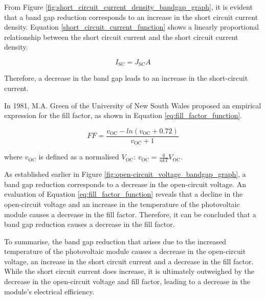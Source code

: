 \noindent From Figure \ref{fig:short_circuit_current_density_bandgap_graph}, it is evident that a band gap reduction corresponds to an increase in the short circuit current density. Equation \ref{short_circuit_current_function} shows a linearly proportional relationship between the short circuit current and the short circuit current density.

\begin{equation}
    I_\text{SC} = J_\text{SC}A
    \label{short_circuit_current_function}
\end{equation}

\noindent Therefore, a decrease in the band gap leads to an increase in the short-circuit current. \cite{HonsbergShort-CircuitCurrent}\vspace{0.5em}

\noindent In 1981, M.A. Green of the University of New South Wales proposed an empirical expression for the fill factor, as shown in Equation \ref{eq:fill_factor_function}.

\begin{equation}
    FF = \frac{v_\text{OC} - ln(v_\text{OC} + 0.72)}{v_\text{OC} + 1}
    \label{eq:fill_factor_function}
\end{equation}\vspace{0em}

\noindent where $v_\text{OC}$ is defined as a normalised $V_\text{OC}$: $v_\text{OC} = \frac{q}{nkT} V_\text{OC}$. \cite{Green1981SolarExpressions}\vspace{0.5em}

\noindent As established earlier in Figure \ref{fig:open-circuit_voltage_bandgap_graph}, a band gap reduction corresponds to a decrease in the open-circuit voltage. An evaluation of Equation \ref{eq:fill_factor_function} reveals that a decline in the open-circuit voltage and an increase in the temperature of the photovoltaic module causes a decrease in the fill factor. Therefore, it can be concluded that a band gap reduction causes a decrease in the fill factor.\vspace{0.5em}

\noindent To summarise, the band gap reduction that arises due to the increased temperature of the photovoltaic module causes a decrease in the open-circuit voltage, an increase in the short circuit current and a decrease in the fill factor. While the short circuit current does increase, it is ultimately outweighed by the decrease in the open-circuit voltage and fill factor, leading to a decrease in the module's electrical efficiency.\vspace{0.5em}

